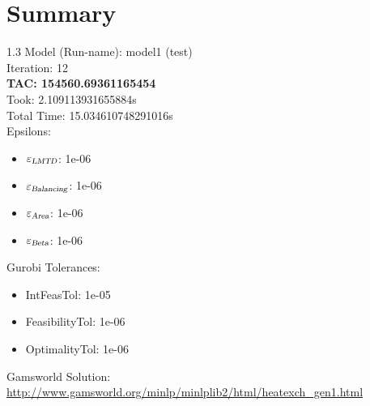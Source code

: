 \documentclass{article}%
\begin{document}
%
\normalsize%
\section{Summary}%
\thispagestyle{plain}%
\begin{spacing}{1.3}%
\Large%
Model (Run-name): model1 (test)\\%
Iteration: 12\\%
\textbf{TAC: 154560.69361165454}\\%
Took: 2.109113931655884s\\%
Total Time: 15.034610748291016s\\%
Epsilons:%
\begin{itemize}%
	\item $\varepsilon_{\textsl{LMTD}}$: 1e-06%
	\item $\varepsilon_{\textsl{Balancing}}$: 1e-06%
	\item $\varepsilon_{\textsl{Area}}$: 1e-06%
	\item $\varepsilon_{\textsl{Beta}}$: 1e-06%
\end{itemize}%
Gurobi Tolerances:%
\begin{itemize}%
	\item IntFeasTol: 1e-05%
	\item FeasibilityTol: 1e-06%
	\item OptimalityTol: 1e-06%
\end{itemize}%
\end{spacing}%
\normalsize%
Gamsworld Solution: \url{http://www.gamsworld.org/minlp/minlplib2/html/heatexch_gen1.html}%
%
\clearpage%
\end{document}
